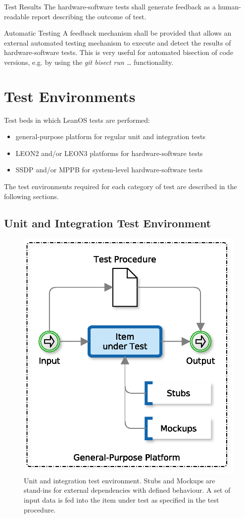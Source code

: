  {Test Results}{%
The hardware-software tests shall generate feedback as a human-readable %
report describing the outcome of test.%
}{}


 {Automatic Testing}{%
A feedback mechanism shall be provided that allows an external automated %
testing mechanism to execute and detect the results of hardware-software tests.%
}{This is very useful for automated bisection of code versions, e.g. by %
using the \emph{git bisect run \ldots} functionality.}%





\chapter{Test Environments}

Test beds in which LeanOS tests are performed:

\begin{itemize}
	\item general-purpose platform for regular unit and integration tests
	\item \gls{LEON2} and/or \gls{LEON3} platforms for hardware-software tests
	\item \gls{SSDP} and/or \gls{MPPB} for system-level hardware-software tests
\end{itemize}

\noindent
The test environments required for each category of test are described in the
following sections.

\newpage
\section{Unit and Integration Test Environment}

\begin{figure}[]
\begin{center}
	\includegraphics[width=0.5\columnwidth]{images/unittest}
	\caption{Unit and integration test environment. Stubs and Mockups %
	are stand-ins for external dependencies with defined behaviour. %
	A set of input data is fed into the item under test as specified %
	in the test procedure.}
	\label{fig:unittest}
\end{center}
\end{figure}

